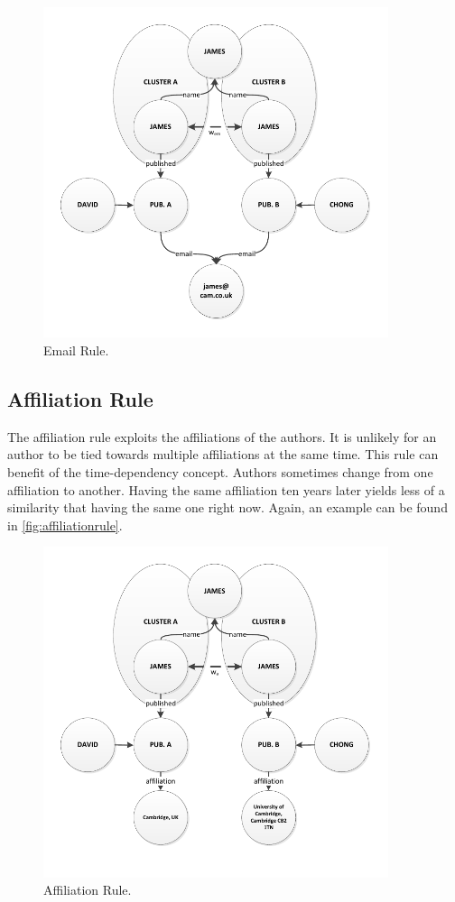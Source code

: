 \begin{figure}[h!]
	\centering
		\includegraphics[width=0.9\textwidth]{fig/emailrule}
	\caption{Email Rule.}
	\label{fig:emailrule}
\end{figure}

\subsection{Affiliation Rule}

The affiliation rule exploits the affiliations of the authors. It is unlikely for an author to be tied towards multiple affiliations at the same time. This rule can benefit of the time-dependency concept. Authors sometimes change from one affiliation to another. Having the same affiliation ten years later yields less of a similarity that having the same one right now. Again, an example can be found in \autoref{fig:affiliationrule}.

\begin{figure}[h!]
	\centering
		\includegraphics[width=0.9\textwidth]{fig/affiliationrule}
	\caption{Affiliation Rule.}
	\label{fig:affiliationrule}
\end{figure}

